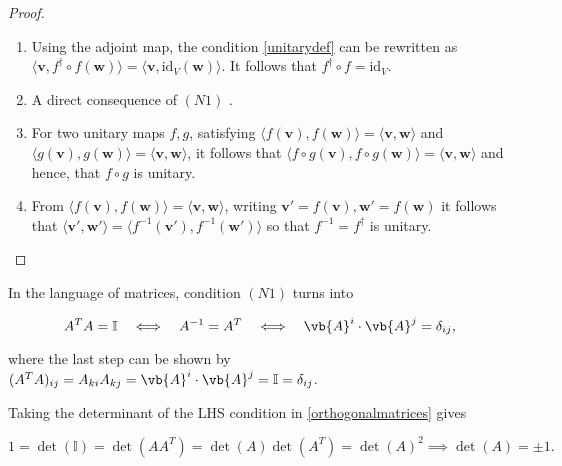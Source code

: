 \documentclass[a4paper,12pt]{report}
\begin{document}
\begin{proof}
    \begin{enumerate}[label=(\(N\)\arabic*)]
        \item Using the adjoint map, the condition \cref{unitarydef}  can be rewritten as 
        \(\langle \mathbf{v}, f^\dagger \circ f(\mathbf{w}) \rangle = \langle \mathbf{v}, \text{id}_V(\mathbf{w}) \rangle\). It follows that \(f^\dagger \circ f = \text{id}_V\).
    
        \item A direct consequence of \((N1)\) .
    
        \item For two unitary maps \( f, g \), satisfying \( \langle f(\mathbf{v}), f(\mathbf{w}) \rangle = \langle \mathbf{v}, \mathbf{w} \rangle \) and 
        \( \langle g(\mathbf{v}), g(\mathbf{w}) \rangle = \langle \mathbf{v}, \mathbf{w} \rangle \), it follows that 
        \( \langle f \circ g(\mathbf{v}), f \circ g(\mathbf{w}) \rangle = \langle \mathbf{v}, \mathbf{w} \rangle \) and hence, that \( f \circ g \) is unitary.
    
        \item From \( \langle f(\mathbf{v}), f(\mathbf{w}) \rangle = \langle \mathbf{v}, \mathbf{w} \rangle \), writing \( \mathbf{v}' = f(\mathbf{v}), \mathbf{w}' = f(\mathbf{w}) \) it follows that 
        \( \langle \mathbf{v}', \mathbf{w}' \rangle = \langle f^{-1}(\mathbf{v}'), f^{-1}(\mathbf{w}') \rangle \) so that \( f^{-1} = f^\dagger \) is unitary.
    \end{enumerate}
\end{proof}

In the language of matrices, condition \((N1)\)  turns into

\begin{equation} \label{orthogonalmatrices} 
A^T A = \mathbb{I} \quad \Longleftrightarrow \quad A^{-1} = A^T \quad \Longleftrightarrow \quad \vb{A} ^i \cdot \vb{A} ^j = \delta_{ij},
\end{equation}

where the last step can be shown by \((A^{T}A)_{ij}  = A_{ki}A_{kj} = \vb{A} ^{i} \cdot \vb{A} ^{j}   =  \mathbb{I} = \delta _{ij}  \).


Taking the determinant of the LHS condition in \cref{orthogonalmatrices} gives 

\begin{equation}
    1 = \det(\mathbb{I}) = \det(AA^T) = \det(A) \det(A^T) = \det(A)^2 \implies \det(A) = \pm 1.
\end{equation}
\end{document}
